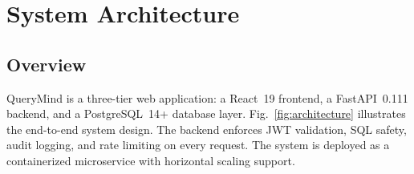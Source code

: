 \documentclass[conference]{IEEEtran}
\begin{document}
\section{System Architecture}

\subsection{Overview}
QueryMind is a three-tier web application: a React~19 frontend, a FastAPI~0.111 backend, and a PostgreSQL~14+ database layer. Fig.~\ref{fig:architecture} illustrates the end-to-end system design. The backend enforces JWT validation, SQL safety, audit logging, and rate limiting on every request. The system is deployed as a containerized microservice with horizontal scaling support.
\end{document}
